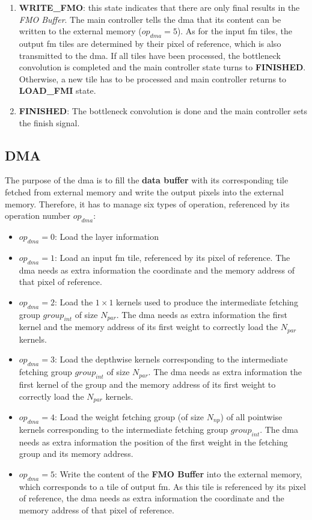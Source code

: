 \begin{enumerate}
    \item \textbf{WRITE\_FMO}: this state indicates that there are only final results in the \textit{FMO Buffer}. The main controller tells the \acrshort{dma} that its content can be written to the external memory ($op_{dma} = 5$). As for the input \acrshort{fm} tiles, the output \acrshort{fm} tiles are determined by their pixel of reference, which is also transmitted to the \acrshort{dma}. If all tiles have been processed, the bottleneck convolution is completed and the main controller state turns to \textbf{FINISHED}. Otherwise, a new tile has to be processed and main controller returns to \textbf{LOAD\_FMI} state.
    \item \textbf{FINISHED}: The bottleneck convolution is done and the main controller sets the finish signal.
\end{enumerate}
%
\subsection{DMA}
%
The purpose of the \acrshort{dma} is to fill the \textbf{data buffer} with its corresponding tile fetched from external memory and write the output pixels into the external memory. Therefore, it has to manage six types of operation, referenced by its operation number $op_{dma}$:
%
\begin{itemize}
    \item $op_{dma} = 0$: Load the layer information
    \item $op_{dma} = 1$: Load an input \acrshort{fm} tile, referenced by its pixel of reference. The \acrshort{dma} needs as extra information the coordinate and the memory address of that pixel of reference.
    \item $op_{dma} = 2$: Load the $1 \times 1$ kernels used to produce the intermediate fetching group $group_{int}$ of size $N_{par}$. The \acrshort{dma} needs as extra information the first kernel and the memory address of its first weight to correctly load the $N_{par}$ kernels.
    \item $op_{dma} = 3$: Load the depthwise kernels corresponding to the intermediate fetching group $group_{int}$ of size $N_{par}$. The \acrshort{dma} needs as extra information the first kernel of the group and the memory address of its first weight to correctly load the $N_{par}$ kernels.
    \item $op_{dma} = 4$: Load the weight fetching group (of size $N_{np}$) of all pointwise kernels corresponding to the intermediate fetching group $group_{int}$. The \acrshort{dma} needs as extra information the position of the first weight in the fetching group and its memory address.
    \item $op_{dma} = 5$: Write the content of the \textbf{FMO Buffer} into the external memory, which corresponds to a tile of output \acrshort{fm}. As this tile is referenced by its pixel of reference, the \acrshort{dma} needs as extra information the coordinate and the memory address of that pixel of reference.
\end{itemize}

